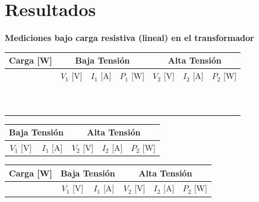 \documentclass[12pt]{article}
\begin{document}
\section{Resultados}
\begin{center}
    \textbf{Mediciones bajo carga resistiva (lineal) en el transformador}

    \vspace{0.25cm}
    \small
    \renewcommand{\arraystretch}{1.25}
    \begin{tabular}{|c|ccc|ccc|}
        \hline
        \multicolumn{1}{|c|}{\textbf{Carga [W]}} & \multicolumn{3}{c|}{\textbf{Baja Tensi\'on}} & \multicolumn{3}{c|}{\textbf{Alta Tensi\'on}} \\
        \hline
        & $V_1$ [V] & $I_1$ [A] & $P_1$ [W] & $V_2$ [V] & $I_2$ [A] & $P_2$ [W] \\
        \hline
         & & & & & & \\
         & & & & & & \\
         & & & & & & \\
         & & & & & & \\
         & & & & & & \\
         & & & & & & \\
         & & & & & & \\
         & & & & & & \\
         & & & & & & \\
         & & & & & & \\
        \hline
    \end{tabular}
\end{center}

\vspace{0.5cm}

\begin{center}
    \small
    \renewcommand{\arraystretch}{1.25}
    \begin{tabular}{|cc|ccc|}
        \hline
        \multicolumn{2}{|c|}{\textbf{Baja Tensi\'on}} & \multicolumn{3}{c|}{\textbf{Alta Tensi\'on}} \\
        \hline
        $V_1$ [V] & $I_1$ [A] & $V_2$ [V] & $I_2$ [A] & $P_2$ [W] \\
        \hline
        \hline
    \end{tabular}
\end{center}

\vspace{0.5cm}

\begin{center}
    \small
    \renewcommand{\arraystretch}{1.25}
    \begin{tabular}{|c|cc|ccc|}
        \hline
        \textbf{Carga [W]} & \multicolumn{2}{c|}{\textbf{Baja Tensi\'on}} & \multicolumn{3}{c|}{\textbf{Alta Tensi\'on}} \\
        \hline
        & $V_1$ [V] & $I_1$ [A] & $V_2$ [V] & $I_2$ [A] & $P_2$ [W] \\
        \hline
        \hline
    \end{tabular}
\end{center}
\end{document}
